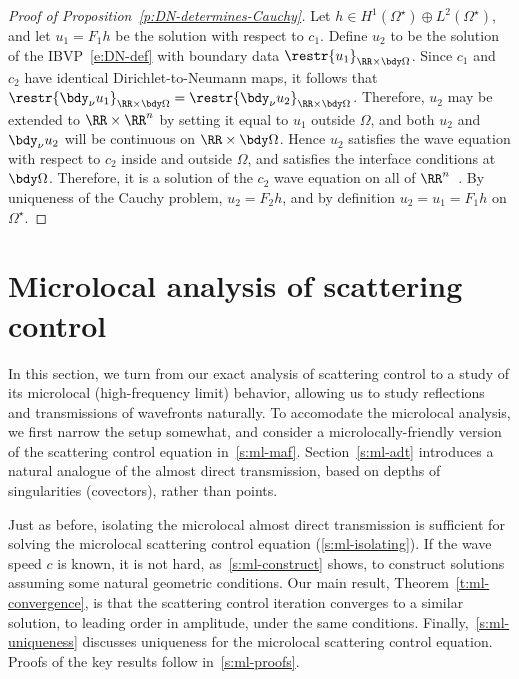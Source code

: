 \documentclass[10pt]{article}
\theoremstyle{plain}
\theoremstyle{definition}
\theoremstyle{remark}
\numberwithin{theorem}{section}
\numberwithin{example}{section}
\numberwithin{equation}{section}
\numberwithin{figure}{section}
\newcommand\sref[1]{\textsection\ref{#1}}					%
\let\d\bdy 						%
\begin{document}
\begin{proof}[Proof of Proposition~\ref{p:DN-determines-Cauchy}]
	Let $h\in H^1(\Omega^\star)\oplus L^2(\Omega^\star)$, and let $u_1=F_1h$ be the solution with respect to $c_1$. Define $u_2$ to be the solution of the IBVP~\eqref{e:DN-def} with boundary data $\restr{u_1}_{\RR\times\bdy\Omega}$. Since $c_1$ and $c_2$ have identical Dirichlet-to-Neumann maps, it follows that $\restr{\d_\nu u_1}_{\RR\times\bdy\Omega}=\restr{\d_\nu u_2}_{\RR\times\bdy\Omega}$. Therefore, $u_2$ may be extended to $\RR\times\RR^n$ by setting it equal to $u_1$ outside $\Omega$, and both $u_2$ and $\d_\nu u_2$ will be continuous on $\RR\times\bdy\Omega$. Hence $u_2$ satisfies the wave equation with respect to $c_2$ inside and outside $\Omega$, and satisfies the interface conditions at $\bdy\Omega$. Therefore, it is a solution of the $c_2$ wave equation on all of $\RR^n$~\cite[Theorem 2.7.3]{StolkThesis}. By uniqueness of the Cauchy problem, $u_2 = F_2h$, and by definition $u_2=u_1=F_1h$ on $\Omega^\star$.
\end{proof}






\section{Microlocal analysis of scattering control}				\label{s:microlocal}


In this section, we turn from our exact analysis of scattering control to a study of its microlocal (high-frequency limit) behavior, allowing us to study reflections and transmissions of wavefronts naturally. To accomodate the microlocal analysis, we first narrow the setup somewhat, and consider a microlocally-friendly version of the scattering control equation in~\sref{s:ml-maf}. Section~\ref{s:ml-adt} introduces a natural analogue of the almost direct transmission, based on depths of singularities (covectors), rather than points.

Just as before, isolating the microlocal almost direct transmission is sufficient for solving the microlocal scattering control equation (\sref{s:ml-isolating}). If the wave speed $c$ is known, it is not hard, as~\sref{s:ml-construct} shows, to construct solutions assuming some natural geometric conditions. Our main result, Theorem~\ref{t:ml-convergence}, is that the scattering control iteration converges to a similar solution, to leading order in amplitude, under the same conditions. Finally,~\sref{s:ml-uniqueness} discusses uniqueness for the microlocal scattering control equation. Proofs of the key results follow in~\sref{s:ml-proofs}.
\end{document}

